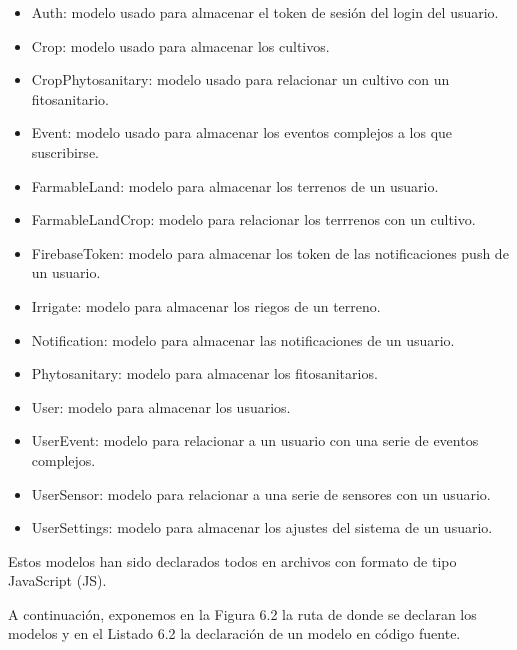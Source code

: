 \begin{itemize}
    \item Auth: modelo usado para almacenar el token de sesión del login del usuario.
    \item Crop: modelo usado para almacenar los cultivos.
    \item CropPhytosanitary: modelo usado para relacionar un cultivo con un fitosanitario.
    \item Event: modelo usado para almacenar los eventos complejos a los que suscribirse.
    \item FarmableLand: modelo para almacenar los terrenos de un usuario.
    \item FarmableLandCrop: modelo para relacionar los terrrenos con un cultivo.
    \item FirebaseToken: modelo para almacenar los token de las notificaciones push de un usuario.
    \item Irrigate: modelo para almacenar los riegos de un terreno.
    \item Notification: modelo para almacenar las notificaciones de un usuario.
    \item Phytosanitary: modelo para almacenar los fitosanitarios.
    \item User: modelo para almacenar los usuarios.
    \item UserEvent: modelo para relacionar a un usuario con una serie de eventos complejos.
    \item UserSensor: modelo para relacionar a una serie de sensores con un usuario.
    \item UserSettings: modelo para almacenar los ajustes del sistema de un usuario.
\end{itemize}

Estos modelos han sido declarados todos en archivos con formato de tipo JavaScript (JS).

A continuación, exponemos en la Figura 6.2 la ruta de donde se declaran los modelos y en el Listado 6.2 la declaración de un modelo en código fuente.

